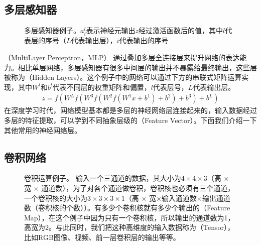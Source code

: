 \documentclass[letterpaper,10pt,english]{sphinxmanual}
\let\sphinxpxdimen\pdfpxdimen\else\newdimen\sphinxpxdimen
\begin{document}
\subsection{多层感知器}
\label{\detokenize{appendix_machine_learning_introduction/neural_network:id5}}
\begin{figure}[H]
\centering
\capstart

\noindent{}
\caption{多层感知器例子。\(a^l_i\)表示神经元输出\(z\)经过激活函数后的值，其中\(l\)代表层的序号（\(L\)代表输出层），\(i\)代表输出的序号}\label{\detokenize{appendix_machine_learning_introduction/neural_network:id19}}\end{figure}

\sphinxAtStartPar
{}（Multi\sphinxhyphen{}Layer Perceptron，MLP）
通过叠加多层全连接层来提升网络的表达能力。相比单层网络，多层感知器有很多中间层的输出并不暴露给最终输出，这些层被称为（Hidden
Layers）。这个例子中的网络可以通过下方的串联式矩阵运算实现，其中\(W^l\)和\(b^l\)代表不同层的权重矩阵和偏置，\(l\)代表层号，\(L\)代表输出层。
\begin{equation}\label{equation:appendix_machine_learning_introduction/neural_network:appendix_machine_learning_introduction/neural_network:3}
\begin{split}{z} = f({W^L}f({W^3}f({W^2}f({W^1}{x} + {b^1}) + {b^2}) + {b^3}) + {b^L})\end{split}
\end{equation}
\sphinxAtStartPar
在深度学习时代，网络模型基本都是多层的神经网络层连接起来的，输入数据经过多层的特征提取，可以学到不同抽象层级的（Feature
Vector）。下面我们介绍一下其他常用的神经网络层。


\subsection{卷积网络}
\label{\detokenize{appendix_machine_learning_introduction/neural_network:id7}}
\begin{figure}[H]
\centering
\capstart

\noindent\sphinxincludegraphics[width=600\sphinxpxdimen]{{conv_computation_v4}.png}
\caption{卷积运算例子。
输入一个三通道的数据，其大小为\(4 \times 4 \times 3\)（高
\(\times\) 宽 \(\times\)
通道数），为了对各个通道做卷积，卷积核也必须有三个通道，一个卷积核的大小为\(3 \times 3 \times 3 \times 1\)（高
\(\times\)
宽\(\times\)输入通道数\(\times\)输出通道数（卷积核的个数））。有多少个卷积核就有多少个输出的（Feature
Map），在这个例子中因为只有一个卷积核，所以输出的通道数为1，高宽为2。与此同时，我们把这种高维度的输入数据称为（Tensor），比如RGB图像、视频、前一层卷积层的输出等等。}\label{\detokenize{appendix_machine_learning_introduction/neural_network:id20}}\label{\detokenize{appendix_machine_learning_introduction/neural_network:conv-computation-v4}}\end{figure}
\end{document}
